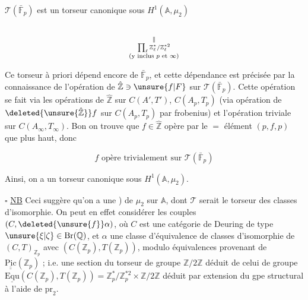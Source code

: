 
$\mathcal T(\bar{\mathbb F}_p)$ est un torseur canonique sous $H^1(\mathbb A,\mu_2)$

\[
\underset{\substack{\Vert\\\prod_\ell\mathbb Z_\ell^*/\mathbb Z_\ell^{*2}\\
\text{(y inclus $p$ et $\infty$)}}}{\vphantom{H^1(\mathbb A,\mu_2)}}
\]


Ce torseur à priori dépend encore de $\bar{\mathbb F}_p$,  et cette
dépendance est précisée par la connaissance de l'opération
de $\hat{\mathbb Z}\ni\unsure{f|F}$ sur $\mathcal T(\bar{\mathbb F}_p)$. Cette opération se fait via
les opérations de $\hat{\mathbb Z}$ sur $C(A',T')$,   $C(A_p,T_p)$
(via opération de $\deleted{\unsure{\hat{\mathbb Z}}}f$ sur $C(A_p,T_p)$ par frobenius) et
l'opération triviale sur $C(A_\infty,T_\infty)$. Bon on trouve que
$f\in\hat{\mathbb Z}$ opère par le $=$ élément $(p,f,p)$ que plus
haut, donc

\[
f\text{ opère trivialement sur }\mathcal T(\bar{\mathbb F}_p)
\]

Ainsi, on a un torseur canonique  sous $H^1(\mathbb A,\mu_2)$.

$\square$ \uline{NB} Ceci suggère qu'on a une  
) de  $\mu_2$ sur $\mathbb A$, dont $\mathcal T$ serait
le torseur des classes d'isomorphie. On peut
en effet considérer les couples $(C,\deleted{\unsure{f}}\alpha)$, où
$C$ est une catégorie de Deuring de type $\unsure{\xi|\zeta}\in\mathrm{Br}(\mathbb Q)$,  et
$\alpha$ une  classe d'équivalence de classes d'isomorphie
de  $(C,T)_{\mathbb Z_p}$ avec $(C(\mathbb Z_p),T(\mathbb Z_p))$, modulo équivalences
provenant de $\underline{\underline{\mathrm{Pic}}}(\mathbb Z_p)$ ; i.e. une section du torseur de
groupe $\mathbb Z/2\mathbb Z$ déduit de celui de groupe $\underline{\mathrm{Equ}}(C(\mathbb Z_p),T(\mathbb Z_p))=\mathbb Z_p^*/\mathbb Z_p^{*2}\times\mathbb Z/2\mathbb Z$
déduit par extension du gpe structural à l'aide de $\mathrm{pr}_2$.


